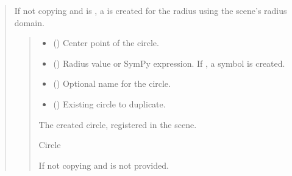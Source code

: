 \documentclass[letterpaper,10pt,english]{sphinxmanual}
\begin{document}
\begin{quote}
\begin{fulllineitems}
\begin{fulllineitems}
\sphinxAtStartPar
If not copying and  is , a 
is created for the radius using the scene’s radius domain.
\begin{quote}\begin{description}
\begin{itemize}
\item {} 
\sphinxAtStartPar
{} (\sphinxstyleliteralemphasis{\sphinxupquote{ | }}) \textendash{} Center point of the circle.

\item {} 
\sphinxAtStartPar
{} (\sphinxstyleliteralemphasis{\sphinxupquote{ | }}\sphinxstyleliteralemphasis{\sphinxupquote{ | }}\sphinxstyleliteralemphasis{\sphinxupquote{ | }}) \textendash{} Radius value or SymPy expression. If , a symbol is created.

\item {} 
\sphinxAtStartPar
{} (\sphinxstyleliteralemphasis{\sphinxupquote{ | }}) \textendash{} Optional name for the circle.

\item {} 
\sphinxAtStartPar
{} (\sphinxstyleliteralemphasis{\sphinxupquote{ | }}) \textendash{} Existing circle to duplicate.

\end{itemize}

\sphinxAtStartPar
The created circle, registered in the scene.

\sphinxAtStartPar
Circle

\sphinxAtStartPar
{} \textendash{} If not copying and  is not provided.


\end{description}
\end{quote}
\end{fulllineitems}
\end{fulllineitems}
\end{quote}
\end{document}

